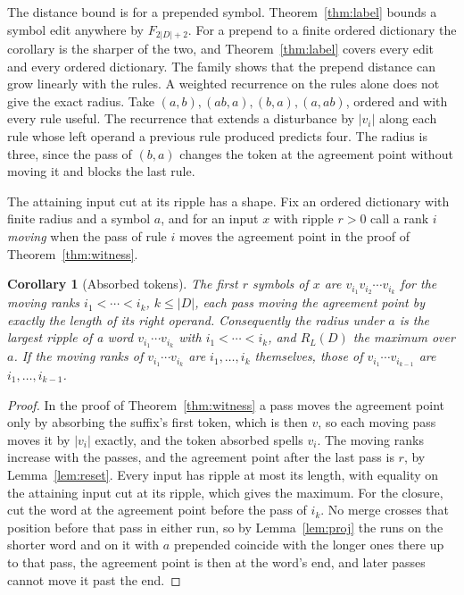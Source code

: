 \documentclass[11pt,a4paper]{article}
\theoremstyle{definition}
\theoremstyle{plain}
\newtheorem{corollary}{Corollary}
\newcommand{\ripple}{R_{L}}
\begin{document}
The distance bound is for a prepended symbol. Theorem~\ref{thm:label} bounds a symbol edit anywhere by \(F_{2|D|+2}\).
For a prepend to a finite ordered dictionary the corollary is the sharper of the two, and Theorem~\ref{thm:label} covers
every edit and every ordered dictionary. The family shows that the prepend distance can grow linearly with the rules. A
weighted recurrence on the rules alone does not give the exact radius. Take \((a,b), (ab,a), (b,a), (a,ab)\), ordered
and with every rule useful. The recurrence that extends a disturbance by \(|v_i|\) along each rule whose left operand a
previous rule produced predicts four. The radius is three, since the pass of \((b, a)\) changes the token at the
agreement point without moving it and blocks the last rule.


The attaining input cut at its ripple has a shape. Fix an ordered dictionary with finite radius and a symbol \(a\), and
for an input \(x\) with ripple \(r > 0\) call a rank \(i\) \emph{moving} when the pass of rule \(i\) moves the agreement
point in the proof of Theorem~\ref{thm:witness}.

\begin{corollary}[Absorbed tokens]\label{cor:chunks}
The first \(r\) symbols of \(x\) are \(v_{i_1} v_{i_2} \cdots v_{i_k}\) for the moving ranks \(i_1 < \cdots < i_k\),
\(k \le |D|\), each pass moving the agreement point by exactly the length of its right operand. Consequently the radius
under \(a\) is the largest ripple of a word \(v_{i_1} \cdots v_{i_k}\) with \(i_1 < \cdots < i_k\), and \(\ripple(D)\)
the maximum over \(a\). If the moving ranks of \(v_{i_1} \cdots v_{i_k}\) are \(i_1, \dots, i_k\) themselves, those of
\(v_{i_1} \cdots v_{i_{k-1}}\) are \(i_1, \dots, i_{k-1}\).
\end{corollary}

\begin{proof}
In the proof of Theorem~\ref{thm:witness} a pass moves the agreement point only by absorbing the suffix's first token,
which is then \(v\), so each moving pass moves it by \(|v_i|\) exactly, and the token absorbed spells \(v_i\). The
moving ranks increase with the passes, and the agreement point after the last pass is \(r\), by Lemma~\ref{lem:reset}.
Every input has ripple at most its length, with equality on the attaining input cut at its ripple, which gives the
maximum. For the closure, cut the word at the agreement point before the pass of \(i_k\). No merge crosses that position
before that pass in either run, so by Lemma~\ref{lem:proj} the runs on the shorter word and on it with \(a\) prepended
coincide with the longer ones there up to that pass, the agreement point is then at the word's end, and later passes
cannot move it past the end.
\end{proof}
\end{document}

